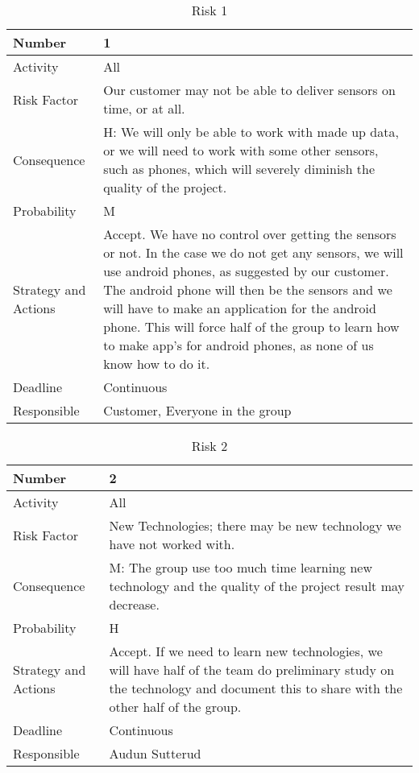 \documentclass[../document.tex]{subfiles}
\begin{document}
\begin{table}[H]
\caption{Risk 1}
\begin{tabularx}{\textwidth}{|l|X|}
\hline
Number
&1
\\ \hline Activity
&All
\\ \hline Risk Factor
&Our customer may not be able to deliver sensors on time, or at all.
\\ \hline Consequence
&H: We will only be able to work with made up data, or we will need to work with some other sensors, such as phones, which will severely diminish the quality of the project.
\\ \hline Probability
&M
\\ \hline Strategy and Actions
&Accept. We have no control over getting the sensors or not. In the case we do not get any sensors, we will use android phones, as suggested by our customer. The android phone will then be the sensors and we will have to make an application for the android phone. This will force half of the group to learn how to make app’s for android phones, as none of us know how to do it.
\\ \hline Deadline
&Continuous
\\ \hline Responsible
&Customer, Everyone in the group
\\ \hline 
\end{tabularx}
\end{table}

\begin{table}[H]
\caption{Risk 2}
\begin{tabularx}{\textwidth}{|l|X|}
\hline
Number
&2
\\ \hline Activity
&All
\\ \hline Risk Factor
&New Technologies; there may be new technology we have not worked with.
\\ \hline Consequence
&M: The group use too much time learning new technology and the quality of the project result may decrease.
\\ \hline Probability
&H
\\ \hline Strategy and Actions
&Accept. If we need to learn new technologies, we will have half of the team do preliminary study on the technology and document this to share with the other half of the group.
\\ \hline Deadline
&Continuous
\\ \hline Responsible
&Audun Sutterud
\\ \hline 
\end{tabularx}
\end{table}
\end{document}
